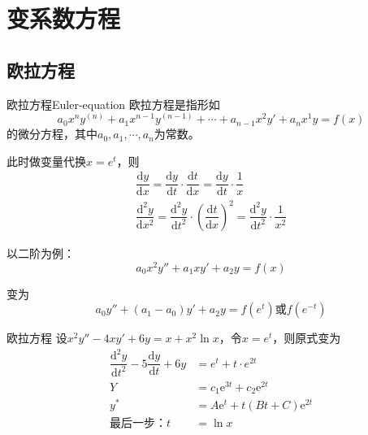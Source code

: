 \documentclass[math]{amznotes}
\begin{document}
\section{变系数方程}
\subsection{欧拉方程}
\begin{dfnbox}{欧拉方程}{Euler-equation}
	欧拉方程是指形如
	\begin{equation*}
		a_0x^ny^{(n)} + a_1x^{n-1}y^{(n-1)} + \cdots + a_{n-1}x^2y' + a_nx^1y = f(x)
	\end{equation*}
	的微分方程，其中$a_0, a_1, \cdots, a_n$为常数。
\end{dfnbox}

此时做变量代换$x = e^t$，则
\begin{align*}
	\dfrac{\mathrm{d}y}{\mathrm{d}x} = \dfrac{\mathrm{d}y}{\mathrm{d}t}\cdot \dfrac{\mathrm{d}t}{\mathrm{d}x} = \dfrac{\mathrm{d}y}{\mathrm{d}t}\cdot \dfrac{1}{x} \\
	\dfrac{\mathrm{d}^2y}{\mathrm{d}x^2} = \dfrac{\mathrm{d}^2y}{\mathrm{d}t^2}\cdot \left(\dfrac{\mathrm{d}t}{\mathrm{d}x}\right)^2 = \dfrac{\mathrm{d}^2y}{\mathrm{d}t^2}\cdot \dfrac{1}{x^2}
\end{align*}

以二阶为例：
\begin{equation*}
	a_0x^2y'' + a_1xy' + a_2y = f(x)
\end{equation*}

变为
\begin{equation*}
	a_0y'' + (a_1 - a_0)y' + a_2y = f(e^t)\text{或}f(e^{-t})
\end{equation*}
\begin{exbox}{欧拉方程}{}
	设$x^2y'' - 4xy' + 6y = x + x^2\ln x$，令$x = e^t$，则原式变为
	\begin{align*}
		\dfrac{\mathrm{d}^2 y}{\mathrm{d}t^2} - 5\dfrac{\mathrm{d}y}{\mathrm{d}t} + 6y & = e^t + t \cdot e^{2t}                       \\
		Y                                                                              & = c_1 \mathrm{e}^{3t} + c_2 \mathrm{e}^{2t}  \\
		y^*                                                                            & = A\mathrm{e}^{t} + t(Bt + C)\mathrm{e}^{2t} \\
		\text{最后一步：}t                                                                  & = \ln x                                      \\
	\end{align*}
\end{exbox}
\end{document}
